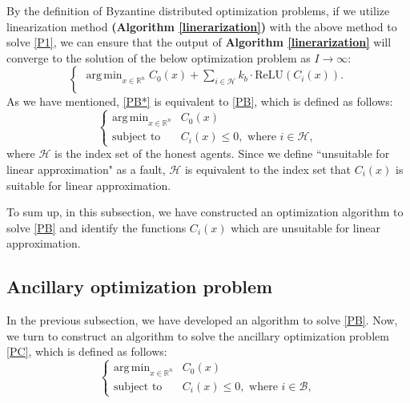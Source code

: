 \documentclass[conference]{IEEEtran}
\DeclareMathOperator*{\argmin}{arg\,min}
\begin{document}
By the definition of Byzantine distributed optimization problems, if we utilize linearization method \textbf{(Algorithm \ref{linerarization})} with the above method to solve \eqref{P1}, we can ensure that the output of \textbf{Algorithm \ref{linerarization}} will converge to the solution of the below optimization problem as $I\rightarrow\infty$:
\begin{equation*}
\tag{PB*}
\begin{cases}
    \argmin_{x\in \mathbb{R}^n} C_0(x) + 
    \sum_{i \in \mathcal{H}} k_b\cdot\text{ReLU}(C_i(x)).\\
\end{cases}
\label{PB*}  
\end{equation*}
As we have mentioned, \eqref{PB*} is equivalent to \eqref{PB}, which is defined as follows:
\begin{equation*}
\tag{PB}
\begin{cases}
    \argmin_{x\in \mathbb{R}^n} &C_0(x)\\
    \text{subject to} &C_i(x) \leq 0, \text{ where } i \in \mathcal{H},
\end{cases}
\label{PB}  
\end{equation*}
where $\mathcal{H}$ is the index set of the honest agents. Since we define ``unsuitable for linear approximation" as a fault, $\mathcal{H}$ is equivalent to the index set that $C_i(x)$ is suitable for linear approximation.

To sum up, in this subsection, we have constructed an optimization algorithm to solve \eqref{PB} and identify the functions $C_i(x)$ which are unsuitable for linear approximation.

\subsection{Ancillary optimization problem}
In the previous subsection, we have developed an algorithm to solve \eqref{PB}. Now, we turn to construct an algorithm to solve the ancillary optimization problem \eqref{PC}, which is defined as follows:
\begin{equation*}
\tag{PC}
\begin{cases}
    \argmin_{x\in \mathbb{R}^n} &C_0(x)\\
    \text{subject to} &C_i(x) \leq 0, \text{ where } i \in \mathcal{B},
\end{cases}
\label{PC}  
\end{equation*}
\end{document}

